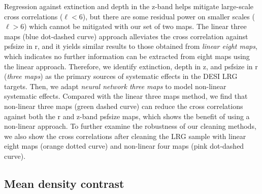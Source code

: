 Regression against extinction and depth in the z-band helps mitigate large-scale cross correlations ($\ell < 6$), but there are some residual power on smaller scales ($\ell > 6$) which cannot be mitigated with our set of two maps. The linear three maps (blue dot-dashed curve) approach alleviates the cross correlation against psfsize in r, and it yields similar results to those obtained from \textit{linear eight maps}, which indicates no further information can be extracted from eight maps using the linear approach. Therefore, we identify extinction, depth in z, and psfsize in r (\textit{three maps}) as the primary sources of systematic effects in the DESI LRG targets. Then, we adapt \textit{neural network three maps} to model non-linear systematic effects. Compared with the linear three maps method, we find that non-linear three maps (green dashed curve) can reduce the cross correlations against both the r and z-band psfsize maps, which shows the benefit of using a non-linear approach. To further examine the robustness of our cleaning methods, we also show the cross correlations after cleaning the LRG sample with linear eight maps (orange dotted curve) and non-linear four maps (pink dot-dashed curve). 

\subsection{Mean density contrast}

